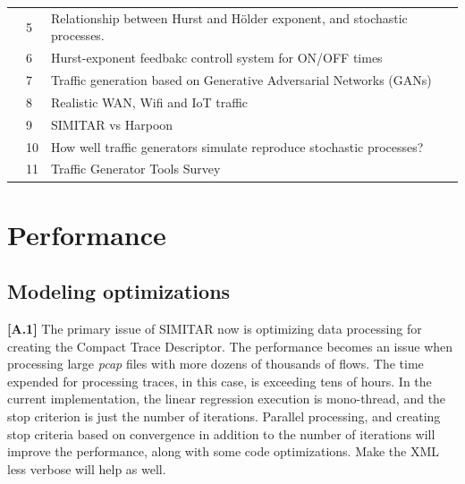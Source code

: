 \begin{table}[!ht]
\begin{tabular}{lll}
                                              & 5                          & Relationship between Hurst and Hölder exponent, and stochastic processes.           \\
                                              & \cellcolor[HTML]{EFEFEF}6  & \cellcolor[HTML]{EFEFEF}Hurst-exponent feedbakc controll system for ON/OFF times   \\
                                              & 7                          & Traffic generation based on  Generative Adversarial Networks (GANs)  \\
                                              & \cellcolor[HTML]{EFEFEF}8  & \cellcolor[HTML]{EFEFEF} Realistic WAN, Wifi and IoT traffic \\
                                              & 9                          & SIMITAR vs Harpoon \\
                                              & \cellcolor[HTML]{EFEFEF}10 & \cellcolor[HTML]{EFEFEF}  How well traffic generators simulate reproduce stochastic processes?\\ 
                                              & 11                          & Traffic Generator Tools Survey \\
                                              \hline
\end{tabular}
\end{table}



\section{Performance}


\subsection{Modeling optimizations}

\textbf{[A.1]} The primary issue of SIMITAR now is optimizing data processing for creating the Compact Trace Descriptor. The performance becomes an issue when processing large \textit{pcap} files with more dozens of thousands of flows. The time expended for processing traces, in this case, is exceeding tens of hours. In the current implementation, the linear regression execution is mono-thread, and the stop criterion is just the number of iterations. Parallel processing, and creating stop criteria based on convergence in addition to the number of iterations will improve the performance, along with some code optimizations. Make the XML less verbose will help as well.

